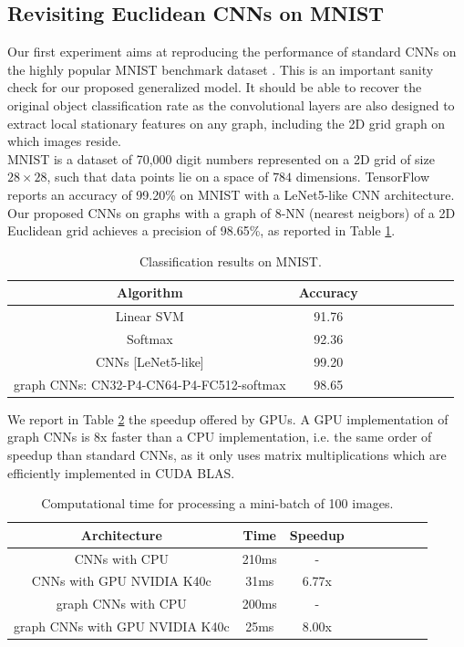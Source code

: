 \documentclass{article}
\begin{document}
 
\subsection{Revisiting Euclidean CNNs on MNIST}
\vspace{-0.2cm}
Our first experiment aims at reproducing the performance of standard CNNs on the highly popular MNIST benchmark dataset \cite{pro:LeCunBottouBengioHaffner98MNIST}. This is an important sanity check for our proposed generalized model. It should be able to recover the original object classification rate as the convolutional layers are also designed to extract local stationary features on any graph, including the 2D grid graph on which images reside. \\
MNIST is a dataset of 70,000 digit numbers represented on a 2D grid of size $28\times 28$, such that data points lie on a space of $784$ dimensions. TensorFlow reports an accuracy of 99.20\% on MNIST with a LeNet5-like CNN architecture. Our proposed CNNs on graphs with a graph of $8$-NN (nearest neigbors) of a 2D Euclidean grid achieves a precision of 98.65\%, as reported in Table \ref{tab1}.


\begin{table}[h!]
 \centering
{\small
\begin{tabular}{|c|c|c|c|c|c|c|c|c|}
\hline
 Algorithm & Accuracy  \\
\hline
Linear SVM & 91.76  \\
Softmax & 92.36  \\
CNNs [LeNet5-like] & 99.20  \\
graph CNNs: CN32-P4-CN64-P4-FC512-softmax & 98.65 \\
\hline
\end{tabular}
}
\caption{Classification results on MNIST.} 
\label{tab1}
\end{table}



\noindent
We report in Table \ref{tab2} the speedup offered by GPUs. A GPU implementation of graph CNNs is 8x faster than a CPU implementation, i.e. the same order of speedup than standard CNNs, as it only uses matrix multiplications which are efficiently implemented in CUDA BLAS.


\begin{table}[h!]
 \centering
{\small
\begin{tabular}{|c|c|c|c|c|c|c|c|c|}
\hline
 Architecture & Time  & Speedup \\
\hline
CNNs with CPU & 210ms & -\\
CNNs with GPU NVIDIA K40c & 31ms & 6.77x\\
graph CNNs with CPU & 200ms & -\\
graph CNNs  with GPU NVIDIA K40c & 25ms & 8.00x\\
\hline
\end{tabular}
}
\caption{Computational time for processing a mini-batch of 100 images.} 
\label{tab2}
\end{table}
\end{document}
